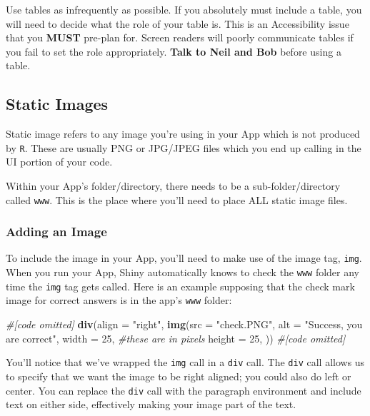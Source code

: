 \documentclass[
]{book}
\newenvironment{Shaded}{\begin{snugshade}}{\end{snugshade}}
\newcommand{\CommentTok}[1]{\textcolor[rgb]{0.56,0.35,0.01}{\textit{#1}}}
\newcommand{\DataTypeTok}[1]{\textcolor[rgb]{0.13,0.29,0.53}{#1}}
\newcommand{\DecValTok}[1]{\textcolor[rgb]{0.00,0.00,0.81}{#1}}
\newcommand{\KeywordTok}[1]{\textcolor[rgb]{0.13,0.29,0.53}{\textbf{#1}}}
\newcommand{\NormalTok}[1]{#1}
\newcommand{\StringTok}[1]{\textcolor[rgb]{0.31,0.60,0.02}{#1}}
\begin{document}
Use tables as infrequently as possible. If you absolutely must include a table, you will need to decide what the role of your table is. This is an Accessibility issue that you \textbf{MUST} pre-plan for. Screen readers will poorly communicate tables if you fail to set the role appropriately. \textbf{Talk to Neil and Bob} before using a table.

\hypertarget{static-images}{%
\subsection{Static Images}\label{static-images}}

Static image refers to any image you're using in your App which is not produced by \texttt{R}. These are usually PNG or JPG/JPEG files which you end up calling in the UI portion of your code.

Within your App's folder/directory, there needs to be a sub-folder/directory called \texttt{www}. This is the place where you'll need to place ALL static image files.

\hypertarget{adding-an-image}{%
\subsubsection{Adding an Image}\label{adding-an-image}}

To include the image in your App, you'll need to make use of the image tag, \texttt{img}. When you run your App, Shiny automatically knows to check the \texttt{www} folder any time the \texttt{img} tag gets called. Here is an example supposing that the check mark image for correct answers is in the app's \texttt{www} folder:

\begin{Shaded}
\begin{Highlighting}[]
\CommentTok{#[code omitted]}
\KeywordTok{div}\NormalTok{(}\DataTypeTok{align =} \StringTok{"right"}\NormalTok{,}
    \KeywordTok{img}\NormalTok{(}\DataTypeTok{src =} \StringTok{"check.PNG"}\NormalTok{,}
        \DataTypeTok{alt =} \StringTok{"Success, you are correct"}\NormalTok{,}
        \DataTypeTok{width =} \DecValTok{25}\NormalTok{, }\CommentTok{#these are in pixels}
        \DataTypeTok{height =} \DecValTok{25}\NormalTok{,}
\NormalTok{        ))}
\CommentTok{#[code omitted]}
\end{Highlighting}
\end{Shaded}

You'll notice that we've wrapped the \texttt{img} call in a \texttt{div} call. The \texttt{div} call allows us to specify that we want the image to be right aligned; you could also do left or center. You can replace the \texttt{div} call with the paragraph environment and include text on either side, effectively making your image part of the text.
\end{document}
